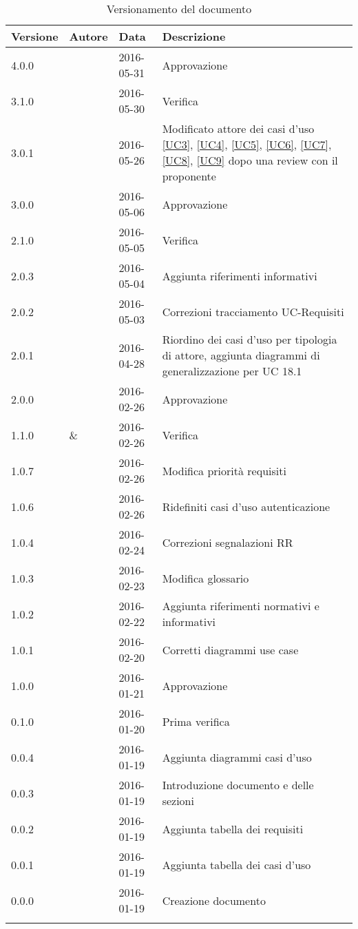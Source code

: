 \documentclass[12pt,a4paper]{article}
\begin{document}
\begin{center}
	\begin{longtable}[H]{p{} p{} p{} p{}}
		\toprule
		\textbf{Versione}	&	\textbf{Autore}	&	\textbf{Data}	&	\textbf{Descrizione}\\*
		\midrule
		\midrule
		4.0.0 & \AVI{} & 2016-05-31 & Approvazione \\*
		\midrule
		3.1.0 & \NDC{} & 2016-05-30 & Verifica \\*
		\midrule
		3.0.1 & \AVE{} & 2016-05-26 & Modificato attore dei casi d'uso \ref{UC3}, \ref{UC4}, \ref{UC5}, \ref{UC6}, \ref{UC7}, \ref{UC8}, \ref{UC9} dopo una review con il proponente \\*
		\midrule
		3.0.0 & \WS{} & 2016-05-06 & Approvazione \\*
		\midrule
		2.1.0 & \AVI{} & 2016-05-05 & Verifica \\*
		\midrule
		2.0.3 & \AVE{} & 2016-05-04 & Aggiunta riferimenti informativi \\*
		\midrule
		2.0.2 & \AVE{} & 2016-05-03 & Correzioni tracciamento UC-Requisiti \\*
		\midrule
		2.0.1 & \TP{} & 2016-04-28 & Riordino dei casi d'uso per tipologia di attore, aggiunta diagrammi di generalizzazione per UC 18.1 \\*
		\midrule
		2.0.0 & \AB{} & 2016-02-26 & Approvazione \\*
		\midrule
		1.1.0 & \AVE{} \& \AVI{} & 2016-02-26 & Verifica \\*
		\midrule
		1.0.7 & \NDC{} & 2016-02-26 & Modifica priorità requisiti \\*
		\midrule
        1.0.6 & \TP{} & 2016-02-26 & Ridefiniti casi d'uso autenticazione \\*
		\midrule
		1.0.4 & \NDC{} & 2016-02-24 &  Correzioni segnalazioni RR \\*
		\midrule
		1.0.3 & \IB{} & 2016-02-23 &  Modifica glossario \\*
		\midrule
		1.0.2 & \IB{} & 2016-02-22 &  Aggiunta riferimenti normativi e informativi \\*
		\midrule
		1.0.1 & \NDC{} & 2016-02-20 &  Corretti diagrammi use case \\*
		\midrule
		1.0.0 & \NDC{} & 2016-01-21 &  Approvazione \\*
		\midrule
		0.1.0 & \AVI{} & 2016-01-20 &  Prima verifica \\*
		\midrule
		0.0.4 & \TP{} & 2016-01-19 & Aggiunta diagrammi casi d'uso\\*
		\midrule
		0.0.3 & \AVE{} & 2016-01-19 &  Introduzione documento e delle sezioni  \\*
		\midrule
		0.0.2 & \AB{} & 2016-01-19 &  Aggiunta tabella dei requisiti \\*
		\midrule
		0.0.1 & \WS{} & 2016-01-19 &  Aggiunta tabella dei casi d'uso \\*
		\midrule
		0.0.0 & \NDC{} & 2016-01-19 &  Creazione documento \\*
		\bottomrule
		\caption{Versionamento del documento}
		\label{tabVers1}
	\end{longtable}
\end{center}
\end{document}
